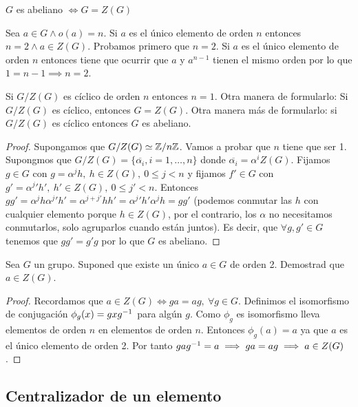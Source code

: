 \begin{pro}
	$G$ es abeliano $\iff G = Z(G)$
\end{pro}

Sea $a \in G \land o(a) = n$. Si $a$ es el único elemento de orden $n$ entonces $n = 2 \land a \in Z(G)$. Probamos primero que $n=2$. Si $a$ es el único elemento de orden $n$ entonces tiene que ocurrir que $a$ y $a^{n-1}$ tienen el mismo orden por lo que $1 = n-1 \implies n = 2$.

\begin{pro}
	\label{pro:triplecentro}
	Si $G/Z(G)$ es cíclico de orden $n$ entonces $n = 1$. Otra manera de formularlo: Si $G/Z(G)$ es cíclico, entonces $G = Z(G)$. Otra manera más de formularlo: si $G/Z(G)$ es cíclico entonces $G$ es abeliano.
\end{pro}

\begin{proof}
	Supongamos que $G/Z(G) \simeq \mathbb{Z}/n\mathbb{Z}$. Vamos a probar que $n$ tiene que ser 1. Supongmos que $G/Z(G) = \{\overline{\alpha_i}, i = 1, \dots, n\}$ donde $\overline{\alpha_i} = \alpha^i Z(G)$. Fijamos $g \in G$ con $g = \alpha^j h,\ h \in Z(G),\ 0 \leq j < n$ y fijamos $f' \in G$ con $g' = {\alpha^j}' h',\ h' \in Z(G),\ 0 \leq j' < n$. Entonces $gg' = \alpha^j h{\alpha^j}' h' = \alpha^{j+j'}hh' = {\alpha^j}' h' \alpha^j h = gg'$ (podemos conmutar las $h$ con cualquier elemento porque $h \in Z(G)$, por el contrario, los $\alpha$ no necesitamos conmutarlos, solo agruparlos cuando están juntos). Es decir, que $\forall g, g' \in G$ tenemos que $gg' = g'g$ por lo que $G$ es abeliano.
\end{proof}


\begin{ej}[Hoja 1, ej 33]
	Sea $G$ un grupo. Suponed que existe un único $a \in G$ de orden 2. Demostrad que $a \in Z(G)$.
\end{ej}

\begin{proof}
	Recordamos que $a \in Z(G) \iff ga = ag,\ \forall g \in G$. Definimos el isomorfismo de conjugación $\phi_g (x) = gxg^{-1}$ para algún $g$. Como $\phi_g$ es isomorfismo lleva elementos de orden $n$ en elementos de orden $n$. Entonces $\phi_g(a) = a$ ya que $a$ es el único elemento de orden 2. Por tanto $gag^{-1} = a \implies ga = ag \implies a \in Z(G)$.
\end{proof}

\subsection{Centralizador de un elemento}

